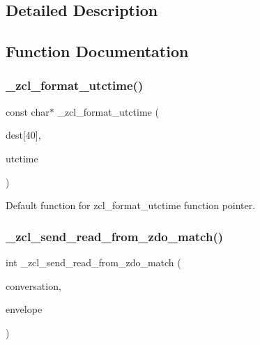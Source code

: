 \subsection{Detailed Description}


\subsection{Function Documentation}
\mbox{\label{group__zcl__client_gab6b575402b7ce107943e7d7c29499559}} 
\subsubsection{\texorpdfstring{\+\_\+zcl\+\_\+format\+\_\+utctime()}{\_zcl\_format\_utctime()}}
{\footnotesize\ttfamily const char$\ast$ \+\_\+zcl\+\_\+format\+\_\+utctime (\begin{DoxyParamCaption}\item[{char}]{dest\mbox{[}40\mbox{]},  }\item[{zcl\+\_\+utctime\+\_\+t}]{utctime }\end{DoxyParamCaption})}



Default function for zcl\+\_\+format\+\_\+utctime function pointer. 

\mbox{\label{group__zcl__client_ga15f191f3166c71f3f436b2a32d108a9f}} 
\subsubsection{\texorpdfstring{\+\_\+zcl\+\_\+send\+\_\+read\+\_\+from\+\_\+zdo\+\_\+match()}{\_zcl\_send\_read\_from\_zdo\_match()}}
{\footnotesize\ttfamily int \+\_\+zcl\+\_\+send\+\_\+read\+\_\+from\+\_\+zdo\+\_\+match (\begin{DoxyParamCaption}\item[{\hyperlink{structwpan__conversation__t}{wpan\+\_\+conversation\+\_\+t} \hyperlink{group__hal_gaef060b3456fdcc093a7210a762d5f2ed}{F\+AR} $\ast$}]{conversation,  }\item[{const \hyperlink{structwpan__envelope__t}{wpan\+\_\+envelope\+\_\+t} \hyperlink{group__hal_gaef060b3456fdcc093a7210a762d5f2ed}{F\+AR} $\ast$}]{envelope }\end{DoxyParamCaption})}

